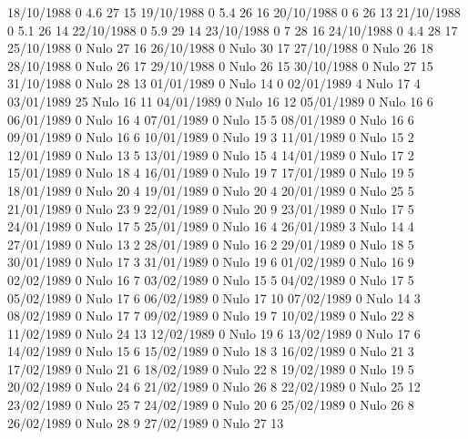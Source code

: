 18/10/1988  0      4.6    27     15 
19/10/1988  0      5.4    26     16 
20/10/1988  0      6      26     13 
21/10/1988  0      5.1    26     14 
22/10/1988  0      5.9    29     14 
23/10/1988  0      7      28     16 
24/10/1988  0      4.4    28     17 
25/10/1988  0     Nulo    27     16 
26/10/1988  0     Nulo    30     17 
27/10/1988  0     Nulo    26     18 
28/10/1988  0     Nulo    26     17 
29/10/1988  0     Nulo    26     15 
30/10/1988  0     Nulo    27     15 
31/10/1988  0     Nulo    28     13 
01/01/1989  0     Nulo    14     0 
02/01/1989  4     Nulo    17     4 
03/01/1989  25    Nulo    16     11 
04/01/1989  0     Nulo    16     12 
05/01/1989  0     Nulo    16     6 
06/01/1989  0     Nulo    16     4 
07/01/1989  0     Nulo    15     5 
08/01/1989  0     Nulo    16     6 
09/01/1989  0     Nulo    16     6 
10/01/1989  0     Nulo    19     3 
11/01/1989  0     Nulo    15     2 
12/01/1989  0     Nulo    13     5 
13/01/1989  0     Nulo    15     4 
14/01/1989  0     Nulo    17     2 
15/01/1989  0     Nulo    18     4 
16/01/1989  0     Nulo    19     7 
17/01/1989  0     Nulo    19     5 
18/01/1989  0     Nulo    20     4 
19/01/1989  0     Nulo    20     4 
20/01/1989  0     Nulo    25     5 
21/01/1989  0     Nulo    23     9 
22/01/1989  0     Nulo    20     9 
23/01/1989  0     Nulo    17     5 
24/01/1989  0     Nulo    17     5 
25/01/1989  0     Nulo    16     4 
26/01/1989  3     Nulo    14     4 
27/01/1989  0     Nulo    13     2 
28/01/1989  0     Nulo    16     2 
29/01/1989  0     Nulo    18     5 
30/01/1989  0     Nulo    17     3 
31/01/1989  0     Nulo    19     6 
01/02/1989  0     Nulo    16     9 
02/02/1989  0     Nulo    16     7 
03/02/1989  0     Nulo    15     5 
04/02/1989  0     Nulo    17     5 
05/02/1989  0     Nulo    17     6 
06/02/1989  0     Nulo    17     10 
07/02/1989  0     Nulo    14     3 
08/02/1989  0     Nulo    17     7 
09/02/1989  0     Nulo    19     7 
10/02/1989  0     Nulo    22     8 
11/02/1989  0     Nulo    24     13 
12/02/1989  0     Nulo    19     6 
13/02/1989  0     Nulo    17     6 
14/02/1989  0     Nulo    15     6 
15/02/1989  0     Nulo    18     3 
16/02/1989  0     Nulo    21     3 
17/02/1989  0     Nulo    21     6 
18/02/1989  0     Nulo    22     8 
19/02/1989  0     Nulo    19     5 
20/02/1989  0     Nulo    24     6 
21/02/1989  0     Nulo    26     8 
22/02/1989  0     Nulo    25     12 
23/02/1989  0     Nulo    25     7 
24/02/1989  0     Nulo    20     6 
25/02/1989  0     Nulo    26     8 
26/02/1989  0     Nulo    28     9 
27/02/1989  0     Nulo    27     13 
